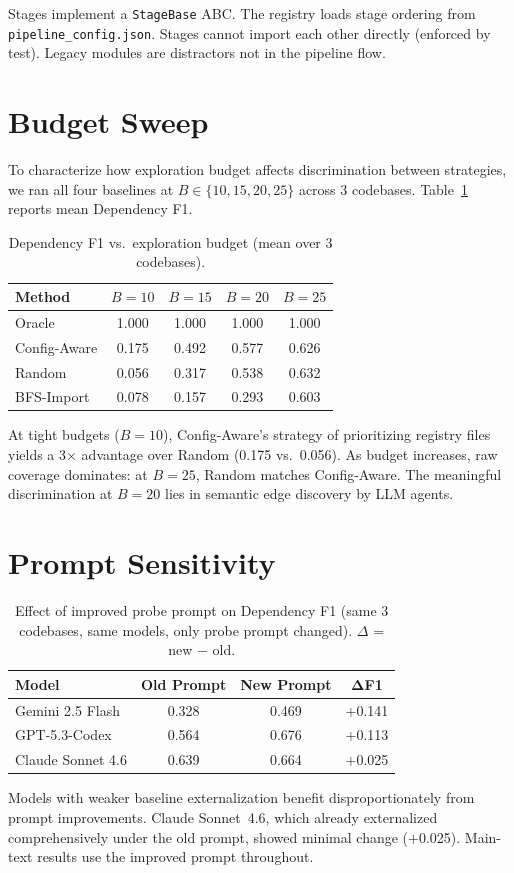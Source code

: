 \documentclass{article}
\begin{document}
Stages implement a \texttt{StageBase} ABC. The registry loads stage ordering from \texttt{pipeline\_config.json}. Stages cannot import each other directly (enforced by test). Legacy modules are distractors not in the pipeline flow.

\section{Budget Sweep}
\label{app:budget}

To characterize how exploration budget affects discrimination between strategies, we ran all four baselines at $B \in \{10, 15, 20, 25\}$ across 3 codebases. Table~\ref{tab:budget} reports mean Dependency F1.

\begin{table}[h]
\centering
\caption{Dependency F1 vs.\ exploration budget (mean over 3 codebases).}
\label{tab:budget}
\begin{tabular}{@{}lcccc@{}}
\toprule
\textbf{Method} & $B{=}10$ & $B{=}15$ & $B{=}20$ & $B{=}25$ \\
\midrule
Oracle       & 1.000 & 1.000 & 1.000 & 1.000 \\
Config-Aware & 0.175 & 0.492 & 0.577 & 0.626 \\
Random       & 0.056 & 0.317 & 0.538 & 0.632 \\
BFS-Import   & 0.078 & 0.157 & 0.293 & 0.603 \\
\bottomrule
\end{tabular}
\end{table}

At tight budgets ($B{=}10$), Config-Aware's strategy of prioritizing registry files yields a 3$\times$ advantage over Random (0.175 vs.\ 0.056). As budget increases, raw coverage dominates: at $B{=}25$, Random matches Config-Aware. The meaningful discrimination at $B{=}20$ lies in semantic edge discovery by LLM agents.

\section{Prompt Sensitivity}
\label{app:prompt_sensitivity}

\begin{table}[h]
\centering
\caption{Effect of improved probe prompt on Dependency F1 (same 3 codebases, same models, only probe prompt changed). $\Delta$ = new $-$ old.}
\label{tab:prompt_ablation}
\begin{tabular}{@{}lccc@{}}
\toprule
\textbf{Model} & \textbf{Old Prompt} & \textbf{New Prompt} & $\boldsymbol{\Delta}$\textbf{F1} \\
\midrule
Gemini 2.5 Flash & 0.328 & 0.469 & +0.141 \\
GPT-5.3-Codex & 0.564 & 0.676 & +0.113 \\
Claude Sonnet 4.6 & 0.639 & 0.664 & +0.025 \\
\bottomrule
\end{tabular}
\end{table}

Models with weaker baseline externalization benefit disproportionately from prompt improvements. Claude Sonnet~4.6, which already externalized comprehensively under the old prompt, showed minimal change ($+$0.025). Main-text results use the improved prompt throughout.
\end{document}
